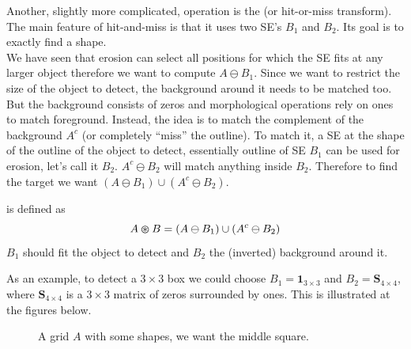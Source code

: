 \documentclass[a4paper]{article}
\begin{document}
Another, slightly more complicated, operation is the  (or hit-or-miss transform). The main feature of hit-and-miss is that it uses two SE's $B_1$ and $B_2$. Its goal is to exactly find a shape.\\
We have seen that erosion can select all positions for which the SE fits at any larger object therefore we want to compute $A \ominus B_1$. Since we want to  restrict the size of the object to detect, the background around it needs to be matched too. But the background consists of zeros and morphological operations rely on ones to match foreground. Instead, the idea is to match the complement of the background $A^c$ (or completely ``miss'' the outline). To match it, a SE at the shape of the outline of the object to detect, essentially outline of SE $B_1$ can be used for erosion, let's call it $B_2$. $A^c \ominus B_2$ will match anything inside $B_2$. Therefore to find the target we want $\left( A \ominus B_1 \right) \cup \left( A^c \ominus B_2 \right)$.
\begin{definition}
 is defined as
\begin{equation}
    A \varoast B= \left( A \ominus B_1 \right) \cup \left( A^c \ominus B_2 \right)
\end{equation}
$B_1$ should fit the object to detect and $B_2$ the (inverted) background around it.
\end{definition}
As an example, to detect a $3\times 3$ box we could choose $B_1 = \textbf{1}_{3\times 3}$ and $B_2 = \textbf{S}_{4\times 4}$, where $\textbf{S}_{4\times 4}$ is a $3 \times 3$ matrix of zeros surrounded by ones.  This is illustrated at the figures below. 
\begin{figure}[H]
    \centering
    
    {\caption{A grid $A$ with some shapes, we want the middle square.}}
\end{figure}
\end{document}
